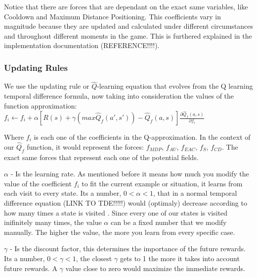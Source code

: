 Notice that there are forces that are dependant on the exact same variables, like Cooldown and Maximum Distance Positioning. This coefficients vary in magnitude because they are updated and calculated under different circumstances and throughout different moments in the game. This is furthered explained in the implementation documentation (REFERENCE!!!!). 


\subsubsection{Updating Rules}

We use the updating rule or $\hat{Q}$-learning equation that evolves from the Q learning temporal difference formula, now taking into consideration the values of the function approximation:  \cite{rl} \\ 
 
$f_i \leftarrow f_i + \alpha [ R(s) + \gamma(max\hat{Q}_f(a',s'))-\hat{Q}_f(a,s) ] \frac{\partial \hat{Q}_f(a,s)}{\partial f_i}$ \\ 

\begin{flushleft}
Where $f_i$ is each one of the coefficients in the Q-approximation. In the context of our  $\hat{Q}_f$ function, it would represent the forces: $f_{MDP}$, $f_{AU}$, $f_{EAC}$, $f_{S}$, $f_{CD}$. The exact same forces that represent each one of the potential fields.  
\end{flushleft} 

\begin{flushleft}
$\alpha$  - Is the learning rate. As mentioned before it means how much you modify the value of the coefficient $f_i$ to fit the current example or situation, it learns from each visit to every state. Its a number, $0 < \alpha < 1$, that in a normal temporal difference equation (LINK TO TDE!!!!!) would (optimaly) decrease according to how many times a state is visited \cite{rl}. Since every one of our states is visited inifinitely many times, the value $\alpha$ can be a fixed number that we modify manually. The higher the value, the more you learn from every specific case.
\end{flushleft} 

\begin{flushleft}
$\gamma$  - Is the discount factor, this determines the importance of the future rewards. Its a number, $0 < \gamma < 1$, the closest $\gamma$ gets to 1 the more it takes into account future rewards. A $\gamma$ value close to zero would maximize the immediate rewards. 
\end{flushleft} 

